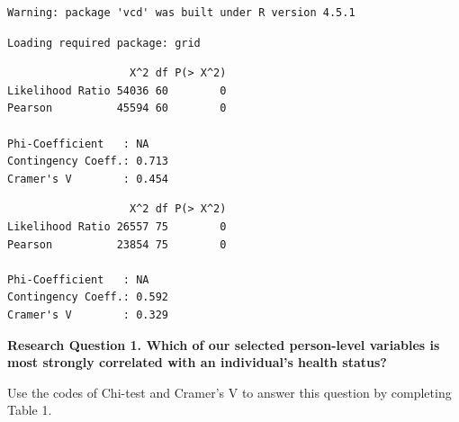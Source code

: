 \documentclass[
  letterpaper,
  DIV=11,
  numbers=noendperiod]{scrreprt}
\newenvironment{Shaded}{\begin{snugshade}}{\end{snugshade}}
\newcommand{\CommentTok}[1]{\textcolor[rgb]{0.37,0.37,0.37}{#1}}
\newcommand{\FunctionTok}[1]{\textcolor[rgb]{0.28,0.35,0.67}{#1}}
\newcommand{\NormalTok}[1]{\textcolor[rgb]{0.00,0.23,0.31}{#1}}
\newcommand{\OtherTok}[1]{\textcolor[rgb]{0.00,0.23,0.31}{#1}}
\newcommand{\SpecialCharTok}[1]{\textcolor[rgb]{0.37,0.37,0.37}{#1}}
\begin{document}
\begin{verbatim}
Warning: package 'vcd' was built under R version 4.5.1
\end{verbatim}

\begin{verbatim}
Loading required package: grid
\end{verbatim}

\begin{Shaded}
\end{Shaded}

\begin{verbatim}
                   X^2 df P(> X^2)
Likelihood Ratio 54036 60        0
Pearson          45594 60        0

Phi-Coefficient   : NA 
Contingency Coeff.: 0.713 
Cramer's V        : 0.454 
\end{verbatim}

\begin{Shaded}
\end{Shaded}

\begin{verbatim}
                   X^2 df P(> X^2)
Likelihood Ratio 26557 75        0
Pearson          23854 75        0

Phi-Coefficient   : NA 
Contingency Coeff.: 0.592 
Cramer's V        : 0.329 
\end{verbatim}

\textbf{Research Question 1. Which of our selected person-level
variables is most strongly correlated with an individual's health
status?}

Use the codes of Chi-test and Cramer's V to answer this question by
completing Table 1.
\end{document}
